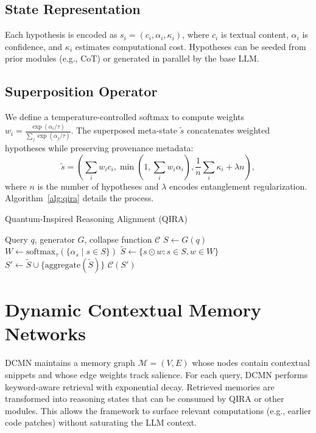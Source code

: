 \documentclass[11pt]{article}
\begin{document}
\subsection{State Representation}
Each hypothesis is encoded as $s_i = (c_i, \alpha_i, \kappa_i)$, where $c_i$ is textual content, $\alpha_i$ is confidence, and $\kappa_i$ estimates computational cost.  Hypotheses can be seeded from prior modules (e.g., CoT) or generated in parallel by the base LLM.

\subsection{Superposition Operator}
We define a temperature-controlled softmax to compute weights $w_i = \frac{\exp(\alpha_i/\tau)}{\sum_j \exp(\alpha_j/\tau)}$.  The superposed meta-state $\tilde{s}$ concatenates weighted hypotheses while preserving provenance metadata:
\begin{equation}
\tilde{s} = \left(\sum_i w_i c_i, \min\left(1, \sum_i w_i\alpha_i\right), \frac{1}{n}\sum_i \kappa_i + \lambda n \right),
\end{equation}
where $n$ is the number of hypotheses and $\lambda$ encodes entanglement regularization.  Algorithm~\ref{alg:qira} details the process.

\begin{algorithm}[t]
\caption{Quantum-Inspired Reasoning Alignment (QIRA)}
\label{alg:qira}
\begin{algorithmic}[1]
\Require Query $q$, generator $G$, collapse function $\mathcal{C}$
\State $S \leftarrow G(q)$ 
\State $W \leftarrow \text{softmax}_\tau(\{\alpha_s \mid s \in S\})$
\State $\tilde{S} \leftarrow \{ s \odot w : s \in S, w \in W \}$
\State $S' \leftarrow \tilde{S} \cup \{\text{aggregate}(\tilde{S})\}$
\State \Return $\mathcal{C}(S')$ 
\end{algorithmic}
\end{algorithm}

\section{Dynamic Contextual Memory Networks}
\label{sec:dcmn}
DCMN maintains a memory graph $\mathcal{M} = (V, E)$ whose nodes contain contextual snippets and whose edge weights track salience.  For each query, DCMN performs keyword-aware retrieval with exponential decay.  Retrieved memories are transformed into reasoning states that can be consumed by QIRA or other modules.  This allows the framework to surface relevant computations (e.g., earlier code patches) without saturating the LLM context.
\end{document}
